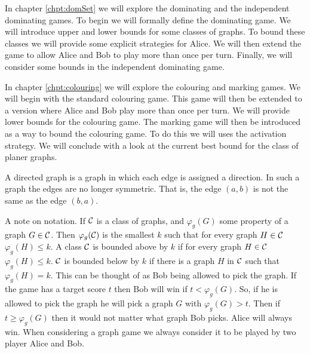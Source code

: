 In chapter \ref{chpt:domSet} we will explore the dominating and the independent dominating games. To begin we  will formally define the dominating game. We will introduce upper and lower bounds for some classes of graphs. To bound these classes we will provide some explicit strategies for Alice. We will then extend the game to allow Alice and Bob to play more than once per turn. Finally, we will consider some bounds in the independent dominating game.

In chapter \ref{chpt:colouring} we will explore the colouring and marking games. We will begin with the standard colouring game. This game will then be extended to a version where Alice and Bob play more than once per turn. We will provide lower bounds for the colouring game. The marking game will then be introduced as a way to bound the colouring game. To do this we will uses the activation strategy. We will conclude with a look at the current best bound for the class of planer graphs.




    
A directed graph is a graph in which each edge is assigned a direction. In such a graph the edges are no longer symmetric. That is, the edge $(a,b)$ is not the same as the edge $(b,a)$.
        
A note on notation. If $\mathcal{C}$ is a class of graphs, and $\varphi_g(G)$ some property of a graph $G \in \mathcal{C}$. Then $\varphi_g(\mathcal{C})$ is the smallest $k$ such that for every graph $H\in\mathcal{C}$ $\varphi_g(H)\leq k$. A class $\mathcal{C}$ is bounded above by $k$ if for every graph $H\in\mathcal{C}$ $\varphi_g(H)\leq k$. $\mathcal{C}$ is bounded below by $k$ if there is a graph $H$ in $\mathcal{C}$ such that $\varphi_g(H)= k$. This can be thought of as Bob being allowed to pick the graph. If the game has a target score $t$ then Bob will win if $t < \varphi_g(G)$. So, if he is allowed to pick the graph he will pick a graph $G$ with $\varphi_g(G) > t$. Then if $t\geq \varphi_g(G)$ then it would not matter what graph Bob picks. Alice will always win. When considering a graph game we always consider it to be played by two player Alice and Bob.  

